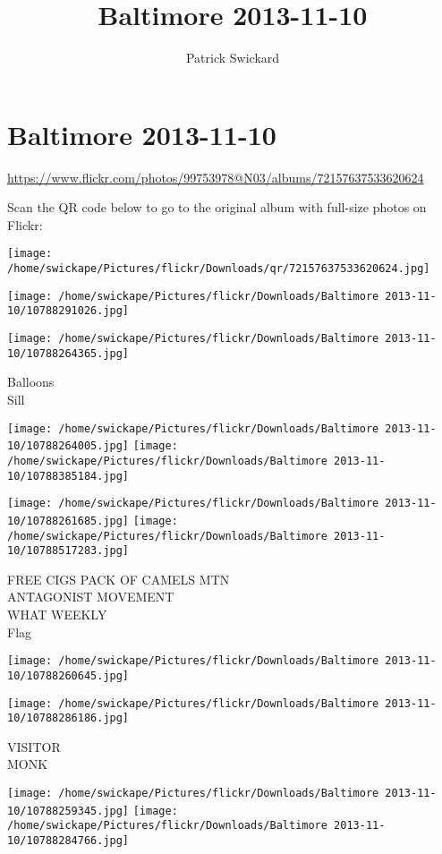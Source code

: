 \documentclass[10pt,letterpaper]{article}
\title{Baltimore 2013-11-10}
\author{Patrick Swickard}
\date{}
\begin{document}
\section*{Baltimore 2013-11-10}

\url{https://www.flickr.com/photos/99753978@N03/albums/72157637533620624}

Scan the QR code below to go to the original album with full-size photos on Flickr:

\texttt{[image: /home/swickape/Pictures/flickr/Downloads/qr/72157637533620624.jpg]}
\pagebreak

\texttt{[image: /home/swickape/Pictures/flickr/Downloads/Baltimore 2013-11-10/10788291026.jpg]}

\vspace{0.25in}
\texttt{[image: /home/swickape/Pictures/flickr/Downloads/Baltimore 2013-11-10/10788264365.jpg]}

Balloons\\
Sill
\pagebreak

\texttt{[image: /home/swickape/Pictures/flickr/Downloads/Baltimore 2013-11-10/10788264005.jpg]}
\texttt{[image: /home/swickape/Pictures/flickr/Downloads/Baltimore 2013-11-10/10788385184.jpg]}

\texttt{[image: /home/swickape/Pictures/flickr/Downloads/Baltimore 2013-11-10/10788261685.jpg]}
\texttt{[image: /home/swickape/Pictures/flickr/Downloads/Baltimore 2013-11-10/10788517283.jpg]}

FREE CIGS PACK OF CAMELS MTN\\
ANTAGONIST MOVEMENT\\
WHAT WEEKLY\\
Flag
\pagebreak

\texttt{[image: /home/swickape/Pictures/flickr/Downloads/Baltimore 2013-11-10/10788260645.jpg]}

\vspace{0.25in}
\texttt{[image: /home/swickape/Pictures/flickr/Downloads/Baltimore 2013-11-10/10788286186.jpg]}

VISITOR\\
MONK
\pagebreak

\texttt{[image: /home/swickape/Pictures/flickr/Downloads/Baltimore 2013-11-10/10788259345.jpg]}
\texttt{[image: /home/swickape/Pictures/flickr/Downloads/Baltimore 2013-11-10/10788284766.jpg]}
\end{document}
